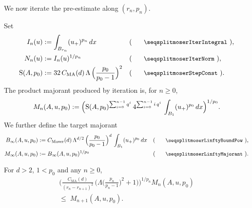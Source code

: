We now iterate the pre-estimate along $(r_n,p_n)$.

\begin{definition}
\label{def:moserIterIntegral}
\leanok
{}
Set
\begin{align*}
  I_n(u) &:= \int_{\Bz{r_n}} (u_+)^{p_n}\,dx
    && (\text{\leanname{moserIterIntegral}}), \\
  N_n(u) &:= I_n(u)^{1/p_n}
    && (\text{\leanname{moserIterNorm}}), \\
  \mathrm{S}(A,p_0) &:= 32\,C_{\mathrm{MA}}(d)\,\Lambda\,\Big(\frac{p_0}{p_0-1}\Big)^{2}
    && (\text{\leanname{moserStepConst}}).
\end{align*}
The product majorant produced by iteration is, for $n \geq 0$,
\begin{equation*}
  M_n(A,u,p_0) :=
  \Big(
    \mathrm{S}(A,p_0)^{\sum_{i=0}^{n-1} q^{i}}\,
    4^{\sum_{i=0}^{n-1} i\,q^{i}}\,
    \int_{B_{1}} (u_+)^{p_0}\,dx
  \Big)^{1/p_0}.
\end{equation*}
We further define the target majorant
\begin{align*}
  B_\infty(A,u,p_0) &:= C_{\mathrm{Moser}}(d)\,\Lambda^{d/2}\,
    \Big(\frac{p_0}{p_0-1}\Big)^{d}\,\int_{\Bz{1}} (u_+)^{p_0}\,dx
    && (\text{\leanname{moserLinftyBoundPow}}), \\
  M_\infty(A,u,p_0) &:= B_\infty(A,u,p_0)^{1/p_0}
    && (\text{\leanname{moserLinftyMajorant}}).
\end{align*}
\end{definition}

\begin{theorem}
\label{thm:moser-step-maj}
\leanok
{}
For $d > 2$, $1 < p_0$ and any $n \geq 0$,
\begin{multline*}
  \Big(\frac{C_{\mathrm{MA}}(d)}{(r_n-r_{n+1})^{2}}\,
    \Big(\Lambda\Big(\frac{p_n}{p_n-1}\Big)^{2}+1\Big)\Big)^{1/p_n}
  M_n(A,u,p_0) \\
  \leq\;
  M_{n+1}(A,u,p_0).
\end{multline*}
\end{theorem}

